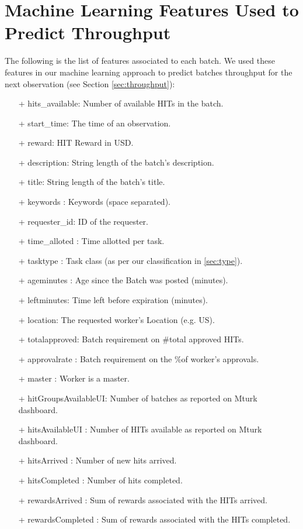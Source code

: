 \appendix
\label{ap:feats}
\section{Machine Learning Features Used to Predict Throughput}
The following is the list of features associated to each batch. We used these features in our machine learning approach to predict batches throughput for the next observation (see Section \ref{sec:throughput}):
\begin{itemize}[noitemsep,topsep=0pt,parsep=0pt,partopsep=0pt]
\item[+] hits\_available:  Number of available HITs in the batch.
\item[+] start\_time:  The time of an observation.
\item[+] reward: HIT Reward in USD.
\item[+] description:  String length of the batch's description.
\item[+] title: String length of the batch's title.
\item[+] keywords : Keywords (space separated).
\item[+] requester\_id:   ID of the requester.
\item[+] time\_alloted : Time allotted per task.
\item[+] tasktype : Task class (as per our classification in \ref{sec:type}).
\item[+] ageminutes : Age since the Batch was posted (minutes).
\item[+] leftminutes: Time left before expiration (minutes).
\item[+] location: The requested worker's Location (e.g. US).
\item[+] totalapproved: Batch requirement on \#total approved HITs.
\item[+] approvalrate : Batch requirement on the \%of worker's approvals.
\item[+] master : Worker is a master.
\item[+] hitGroupsAvailableUI: Number of batches as reported on Mturk dashboard.
\item[+] hitsAvailableUI : Number of HITs available as reported on Mturk dashboard.
\item[+] hitsArrived : Number of new hits arrived.
\item[+] hitsCompleted : Number of hits completed.
\item[+] rewardsArrived : Sum of rewards associated with the HITs arrived.
\item[+] rewardsCompleted : Sum of rewards associated with the HITs completed.

\end{itemize}
